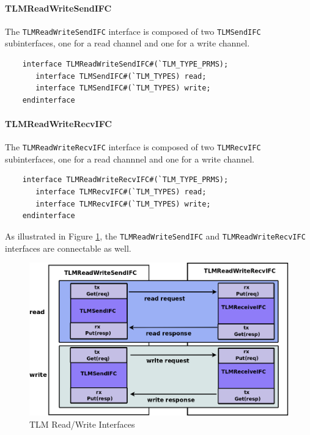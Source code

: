 \documentclass[twoside,letterpaper]{article}
\newcommand{\te}[1]{\texttt{#1}}
\begin{document}
\paragraph{\bf TLMReadWriteSendIFC}

The \te{TLMReadWriteSendIFC} interface is composed of two
\te{TLMSendIFC} subinterfaces, one for a read channel and one for a
write channel.

\begin{verbatim}
    interface TLMReadWriteSendIFC#(`TLM_TYPE_PRMS);
       interface TLMSendIFC#(`TLM_TYPES) read;
       interface TLMSendIFC#(`TLM_TYPES) write;
    endinterface
\end{verbatim}

\paragraph{\bf TLMReadWriteRecvIFC}

The \te{TLMReadWriteRecvIFC} interface is composed of two
\te{TLMRecvIFC} subinterfaces, one for a read channnel and one for a
write channel.

\begin{verbatim}
    interface TLMReadWriteRecvIFC#(`TLM_TYPE_PRMS);
       interface TLMRecvIFC#(`TLM_TYPES) read;
       interface TLMRecvIFC#(`TLM_TYPES) write;
    endinterface
\end{verbatim}

As illustrated in Figure \ref{TLMrwinterface}, the \te{TLMReadWriteSendIFC} and 
\te{TLMReadWriteRecvIFC} interfaces are connectable as well.

\begin{figure}[ht]
\begin{center}
\includegraphics[height = 2.4 in]{TLMrwinterfaces}
\caption{TLM Read/Write Interfaces}
\label{TLMrwinterface}
\end{center}
\end{figure}
\end{document}
